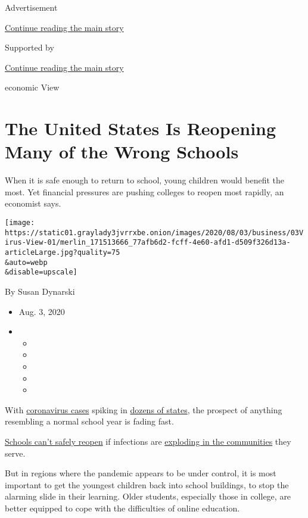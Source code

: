 Advertisement

\protect\hyperlink{after-top}{Continue reading the main story}

Supported by

\protect\hyperlink{after-sponsor}{Continue reading the main story}

economic View

\hypertarget{the-united-states-is-reopening-many-of-the-wrong-schools}{%
\section{The United States Is Reopening Many of the Wrong
Schools}\label{the-united-states-is-reopening-many-of-the-wrong-schools}}

When it is safe enough to return to school, young children would benefit
the most. Yet financial pressures are pushing colleges to reopen most
rapidly, an economist says.

\texttt{[image: https://static01.graylady3jvrrxbe.onion/images/2020/08/03/business/03Virus-View-01/merlin\_171513666\_77afb6d2-fcff-4e60-afd1-d509f326d13a-articleLarge.jpg?quality=75\\\&auto=webp\\\&disable=upscale]}

By Susan Dynarski

\begin{itemize}
\item
  Aug. 3, 2020
\item
  \begin{itemize}
  \item
  \item
  \item
  \item
  \item
  \end{itemize}
\end{itemize}

With
\href{https://www.nytimes3xbfgragh.onion/news-event/coronavirus}{coronavirus
cases} spiking in
\href{https://www.nytimes3xbfgragh.onion/interactive/2020/07/09/us/coronavirus-cases-reopening-trends.html}{dozens
of states}, the prospect of anything resembling a normal school year is
fading fast.

\href{https://www.nytimes3xbfgragh.onion/2020/08/03/us/school-closing-coronavirus.html}{Schools
can't safely reopen} if infections are
\href{https://www.nytimes3xbfgragh.onion/interactive/2020/07/31/us/coronavirus-school-reopening-risk.html}{exploding
in the communities} they serve.

But in regions where the pandemic appears to be under control, it is
most important to get the youngest children back into school buildings,
to stop the alarming slide in their learning. Older students, especially
those in college, are better equipped to cope with the difficulties of
online education.

